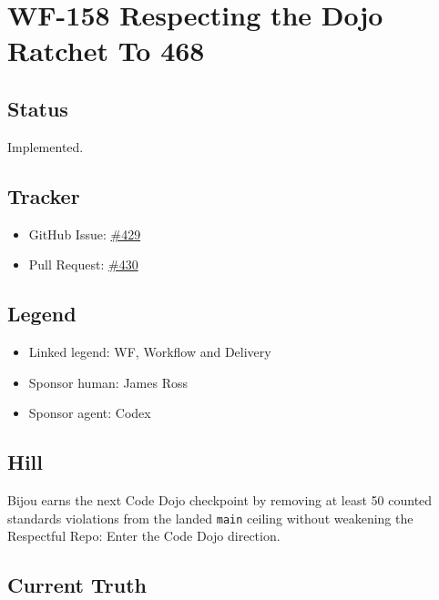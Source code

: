 \chapter{WF-158 Respecting the Dojo Ratchet To 468}\label{record-240}

\smallskip

\section{Status}\label{record-240-status}

Implemented.

\section{Tracker}\label{record-240-tracker}

\begin{itemize}
\tightlist
\item
  GitHub Issue: \href{https://github.com/flyingrobots/bijou/issues/429}{\#429}
\item
  Pull Request: \href{https://github.com/flyingrobots/bijou/pull/430}{\#430}
\end{itemize}

\section{Legend}\label{record-240-legend}

\begin{itemize}
\tightlist
\item
  Linked legend: WF, Workflow and Delivery
\item
  Sponsor human: James Ross
\item
  Sponsor agent: Codex
\end{itemize}

\section{Hill}\label{record-240-hill}

Bijou earns the next Code Dojo checkpoint by removing at least 50 counted standards violations from the landed \texttt{m\allowbreak{}a\allowbreak{}i\allowbreak{}n} ceiling without weakening the Respectful Repo: Enter the Code Dojo direction.

\section{Current Truth}\label{record-240-current-truth}

